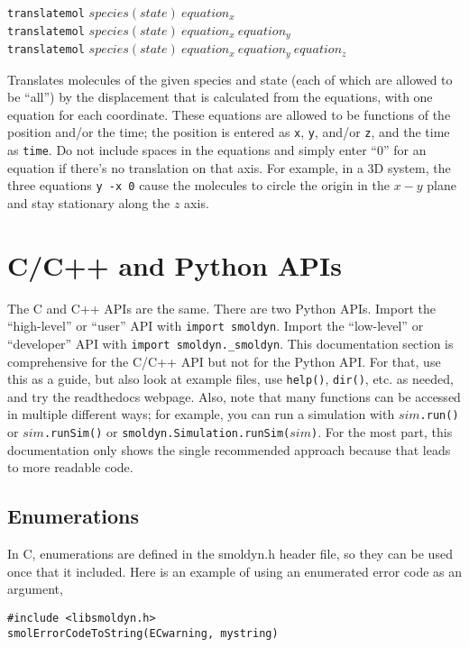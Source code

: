 \documentclass {scrbook}
\newcommand {\ttt} {\texttt}
\begin{document}
\begin{description}
\item{\ttt{translatemol}} $species(state)\ equation_x$\\
\ttt{translatemol} $species(state)\ equation_x\ equation_y$\\
\ttt{translatemol} $species(state)\ equation_x\ equation_y\ equation_z$

Translates molecules of the given species and state (each of which are allowed to be ``all'') by the displacement that is calculated from the equations, with one equation for each coordinate. These equations are allowed to be functions of the position and/or the time; the position is entered as \ttt{x}, \ttt{y}, and/or \ttt{z}, and the time as \ttt{time}. Do not include spaces in the equations and simply enter ``0'' for an equation if there's no translation on that axis. For example, in a 3D system, the three equations \ttt{y -x 0} cause the molecules to circle the origin in the $x-y$ plane and stay stationary along the $z$ axis.

\end{description}


\chapter{C/C++ and Python APIs}
\label{ch:APIReference}

The C and C++ APIs are the same. There are two Python APIs. Import the ``high-level'' or ``user'' API with \ttt{import smoldyn}. Import the ``low-level'' or ``developer'' API with \ttt{import smoldyn.\_smoldyn}. This documentation section is comprehensive for the C/C++ API but not for the Python API. For that, use this as a guide, but also look at example files, use \ttt{help()}, \ttt{dir()}, etc. as needed, and try the readthedocs webpage. Also, note that many functions can be accessed in multiple different ways; for example, you can run a simulation with $sim$\ttt{.run()} or $sim$\ttt{.runSim()} or \ttt{smoldyn.Simulation.runSim($sim$)}. For the most part, this documentation only shows the single recommended approach because that leads to more readable code.

\section{Enumerations}

In C, enumerations are defined in the smoldyn.h header file, so they can be used once that it included. Here is an example of using an enumerated error code as an argument,
\begin{lstlisting}[style=SSAC]
#include <libsmoldyn.h>
smolErrorCodeToString(ECwarning, mystring)
\end{lstlisting}
\end{document}
